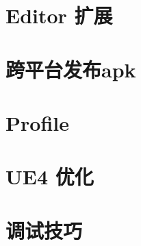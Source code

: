 \documentclass[UTF8,a4paper,12pt]{ctexbook}
\begin{document}
\chapter{Editor 扩展}
		
\chapter{跨平台发布apk}

\chapter{Profile}
	
\chapter{UE4 优化}

\chapter{调试技巧}
	
	
	
	
	
\end{document}
